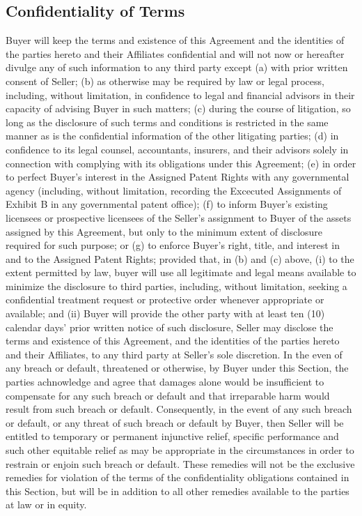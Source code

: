 \documentclass[letterpaper,10pt,english]{sphinxmanual}
\begin{document}
\subsection{Confidentiality of Terms}
\label{\detokenize{7-miscellaneous:confidentiality-of-terms}}
Buyer will keep the terms and existence of this Agreement and the identities of the parties hereto and their Affiliates confidential and will not now or hereafter divulge any of such information to any third party except (a) with prior written consent of Seller; (b) as otherwise may be required by law or legal process, including, without limitation, in confidence to legal and financial advisors in their capacity of advising Buyer in such matters; (c) during the course of litigation, so long as the disclosure of such terms and conditions is restricted in the same manner as is the confidential information of the other litigating parties; (d) in confidence to its legal counsel, accountants, insurers, and their advisors solely in connection with complying with its obligations under this Agreement; (e) in order to perfect Buyer’s interest in the Assigned Patent Rights with any governmental agency (including, without limitation, recording the Excecuted Assignments of Exhibit B in any governmental patent office); (f) to inform Buyer’s existing licensees or prospective licensees of the Seller’s assignment to Buyer of the assets assigned by this Agreement, but only to the minimum extent of disclosure required for such purpose; or (g) to enforce Buyer’s right, title, and interest in and to the Assigned Patent Rights; provided that, in (b) and (c) above,  (i) to the extent permitted by law, buyer will use all legitimate and legal means available to minimize the disclosure to third parties, including, without limitation, seeking a confidential treatment request or protective order whenever appropriate or available; and (ii) Buyer will provide the other party with at least ten (10) calendar days’ prior written notice of such disclosure, Seller may disclose the terms and existence of this Agreement, and the identities of the parties hereto and their Affiliates, to any third party at Seller’s sole discretion.  In the even of any breach or default, threatened or otherwise, by Buyer under this Section, the parties achnowledge and agree that damages alone would be insufficient to compensate for any such breach or default and that irreparable harm would result from such breach or default. Consequently, in the event of any such breach or default, or any threat of such breach or default by Buyer, then Seller will be entitled to temporary or permanent injunctive relief, specific performance and such other equitable relief as may be appropriate in the circumstances in order to restrain or enjoin such breach or default. These remedies will not be the exclusive remedies for violation of the terms of the confidentiality obligations contained in this Section, but will be in addition to all other remedies available to the parties at law or in equity.
\end{document}
